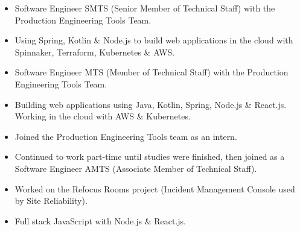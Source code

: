 \documentclass[10pt,a4paper,ragged2e]{cv}
\begin{document}


\begin{fullwidth}
\makecvheader
\end{fullwidth}


\begin{itemize}
\item Software Engineer SMTS (Senior Member of Technical Staff) with the Production Engineering Tools Team.
\item Using Spring, Kotlin \& Node.js to build web applications in the cloud with Spinnaker, Terraform, Kubernetes \& AWS.
\end{itemize}

\divider

\begin{itemize}
\item Software Engineer MTS (Member of Technical Staff) with the Production Engineering Tools Team.
\item Building web applications using Java, Kotlin, Spring, Node.js \& React.js. Working in the cloud with AWS \& Kubernetes.
\end{itemize}

\divider

\begin{itemize}
\item Joined the Production Engineering Tools team as an intern.
\item Continued to work part-time until studies were finished, then joined as a Software Engineer AMTS (Associate Member of Technical Staff).
\item Worked on the Refocus Rooms project (Incident Management Console used by Site Reliability).
\item Full stack JavaScript with Node.js \& React.js.
\end{itemize}
\end{document}
